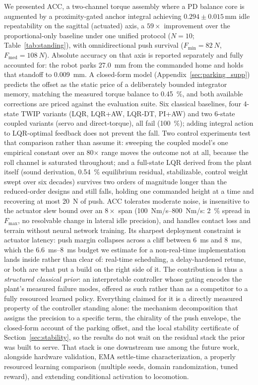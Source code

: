 \documentclass[a4paper,fleqn]{cas-dc}
\begin{document}
We presented ACC, a two-channel torque assembly where a PD balance core is augmented by a proximity-gated anchor integral achieving $0.294{\pm}0.015$\,mm idle repeatability on the sagittal (actuated) axis, a $59{\times}$ improvement over the proportional-only baseline under one unified protocol ($N{=}10$; Table~\ref{tab:standing}), with omnidirectional push survival ($F_{\min}{=}\SI{82}{N}$, $F_{\text{med}}{=}\SI{108}{N}$). Absolute accuracy on that axis is reported separately and fully accounted for: the robot parks \SI{27.0}{mm} from the commanded home and holds that standoff to \SI{0.009}{mm}. A closed-form model (Appendix~\ref{sec:parking_supp}) predicts the offset as the static price of a deliberately bounded integrator memory, matching the measured torque balance to \SI{0.45}{\percent}, and both available corrections are priced against the evaluation suite.
Six classical baselines, four 4-state TWIP variants (LQR, LQR+AW, LQR-DT, PI+AW) and two 6-state coupled variants (servo and direct-torque), all fail (\SI{100}{\percent}); adding integral action to LQR-optimal feedback does not prevent the fall. Two control experiments test that comparison rather than assume it: sweeping the coupled model's one empirical constant over an \num{80}$\times$ range moves the outcome not at all, because the roll channel is saturated throughout; and a full-state LQR derived from the plant itself (sound derivation, \SI{0.54}{\percent} equilibrium residual, stabilizable, control weight swept over six decades) survives two orders of magnitude longer than the reduced-order designs and still falls, holding one commanded height at a time and recovering at most \SI{20}{N} of push.
ACC tolerates moderate noise, is insensitive to the actuator slew bound over an $8{\times}$ span (\SIrange{100}{800}{Nm/s}: \SI{2}{\percent} spread in $F_{\max}$, no resolvable change in lateral idle precision), and handles contact loss and terrain without neural network training. Its sharpest deployment constraint is actuator latency: push margin collapses across a cliff between \SI{6}{ms} and \SI{8}{ms}, which the \SIrange{6.6}{8}{ms} budget we estimate for a non-real-time implementation lands inside rather than clear of: real-time scheduling, a delay-hardened retune, or both are what put a build on the right side of it.
The contribution is thus a \emph{structured classical prior}: an interpretable controller whose gating encodes the plant's measured failure modes, offered as such rather than as a competitor to a fully resourced learned policy. Everything claimed for it is a directly measured property of the controller standing alone: the mechanism decomposition that assigns the precision to a specific term, the chirality of the push envelope, the closed-form account of the parking offset, and the local stability certificate of Section~\ref{sec:stability}, so the results do not wait on the residual stack the prior was built to serve. That stack is one downstream use among the future work, alongside hardware validation, EMA settle-time characterization, a properly resourced learning comparison (multiple seeds, domain randomization, tuned reward), and extending conditional activation to locomotion.
\end{document}
